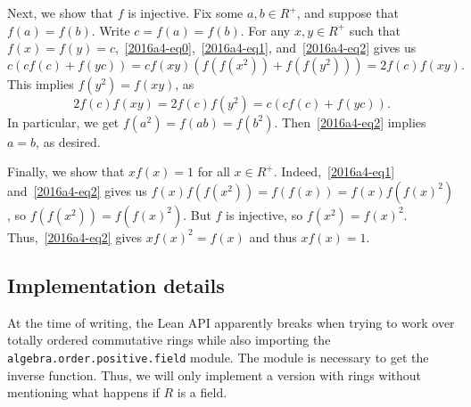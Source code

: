 \documentclass{article}
\begin{document}
Next, we show that $f$ is injective.
Fix some $a, b \in R^+$, and suppose that $f(a) = f(b)$.
Write $c = f(a) = f(b)$.
For any $x, y \in R^+$ such that $f(x) = f(y) = c$,~\eqref{2016a4-eq0},~\eqref{2016a4-eq1}, and~\eqref{2016a4-eq2} gives us
\[ c(c f(c) + f(yc)) = c f(xy) (f(f(x^2)) + f(f(y^2))) = 2 f(c) f(xy). \]
This implies $f(y^2) = f(xy)$, as
\[ 2 f(c) f(xy) = 2 f(c) f(y^2) = c(c f(c) + f(yc)). \]
In particular, we get $f(a^2) = f(ab) = f(b^2)$.
Then~\eqref{2016a4-eq2} implies $a = b$, as desired.

Finally, we show that $x f(x) = 1$ for all $x \in R^+$.
Indeed,~\eqref{2016a4-eq1} and~\eqref{2016a4-eq2} gives us $f(x) f(f(x^2)) = f(f(x)) = f(x) f(f(x)^2)$, so $f(f(x^2)) = f(f(x)^2)$.
But $f$ is injective, so $f(x^2) = f(x)^2$.
Thus,~\eqref{2016a4-eq2} gives $x f(x)^2 = f(x)$ and thus $x f(x) = 1$.



\subsection*{Implementation details}

At the time of writing, the Lean API apparently breaks when trying to work over totally ordered commutative rings while also importing the \texttt{algebra.order.positive.field} module.
The module is necessary to get the inverse function.
Thus, we will only implement a version with rings without mentioning what happens if $R$ is a field.
\end{document}
